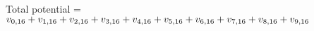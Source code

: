 \documentclass[preview]{standalone}
\begin{document}
\begin{center}
Total potential = $v_{0,16} + \\ v_{1,16} + \\ v_{2,16} + \\ v_{3,16} + \\ v_{4,16} + \\ v_{5,16} + \\ v_{6,16} + \\ v_{7,16} + \\ v_{8,16} + \\ v_{9,16}$
\end{center}
\end{document}
